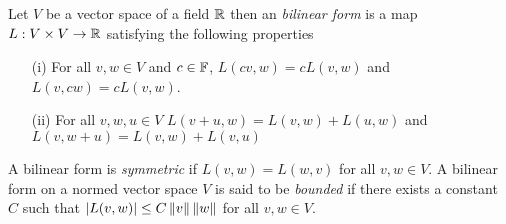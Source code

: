 \begin{defn}Let $V$ be a vector space of a field $\mathbb{R}$ then an
  \emph{bilinear form} is a map $L : V \times V \to \mathbb{R}$ 
satisfying the following properties
\begin{itemize}
\item[(i)] For all $v,w \in V$ and $c \in \mathbb{F}$, $L(cv, w)= c L(v,w)$ and $L(v,cw)= c L(v,w)$.
\item[(ii)] For all $v,w,u \in V$ $L(v + u, w) = L(v,w)+ L(u, w)$ and $L(v, w+u) = L(v,w) + L(v, u)$
\end{itemize}
A bilinear form is \emph{symmetric} if $L(v,w) = L(w,v)$ for all $v,w \in V$.
A bilinear form on a normed vector space $V$ is said to be \emph{bounded} if there exists a constant $C$ such that $\left \vert L(v,w) \right \vert \leq C \left \lVert v \right \rVert \left \lVert w \right \rVert$ for all $v, w \in V$.
\end{defn}

